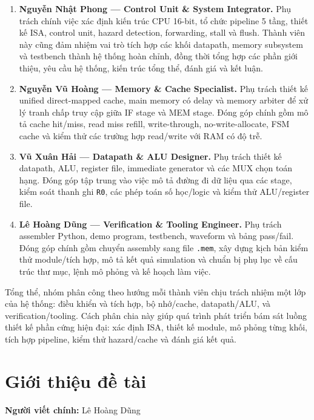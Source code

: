 \documentclass[11pt,a4paper]{article}
\theoremstyle{definition}
\theoremstyle{remark}
\begin{document}
	\begin{enumerate}
		\item \textbf{Nguyễn Nhật Phong --- Control Unit \& System Integrator.} Phụ trách chính việc xác định kiến trúc CPU 16-bit, tổ chức pipeline 5 tầng, thiết kế ISA, control unit, hazard detection, forwarding, stall và flush. Thành viên này cũng đảm nhiệm vai trò tích hợp các khối datapath, memory subsystem và testbench thành hệ thống hoàn chỉnh, đồng thời tổng hợp các phần giới thiệu, yêu cầu hệ thống, kiến trúc tổng thể, đánh giá và kết luận.
		\item \textbf{Nguyễn Vũ Hoàng --- Memory \& Cache Specialist.} Phụ trách thiết kế unified direct-mapped cache, main memory có delay và memory arbiter để xử lý tranh chấp truy cập giữa IF stage và MEM stage. Đóng góp chính gồm mô tả cache hit/miss, read miss refill, write-through, no-write-allocate, FSM cache và kiểm thử các trường hợp read/write với RAM có độ trễ.
		\item \textbf{Vũ Xuân Hải --- Datapath \& ALU Designer.} Phụ trách thiết kế datapath, ALU, register file, immediate generator và các MUX chọn toán hạng. Đóng góp tập trung vào việc mô tả đường đi dữ liệu qua các stage, kiểm soát thanh ghi \texttt{R0}, các phép toán số học/logic và kiểm thử ALU/register file.
		\item \textbf{Lê Hoàng Dũng --- Verification \& Tooling Engineer.} Phụ trách assembler Python, demo program, testbench, waveform và bảng pass/fail. Đóng góp chính gồm chuyển assembly sang file \texttt{.mem}, xây dựng kịch bản kiểm thử module/tích hợp, mô tả kết quả simulation và chuẩn bị phụ lục về cấu trúc thư mục, lệnh mô phỏng và kế hoạch làm việc.
	\end{enumerate}
	
	Tổng thể, nhóm phân công theo hướng mỗi thành viên chịu trách nhiệm một lớp của hệ thống: điều khiển và tích hợp, bộ nhớ/cache, datapath/ALU, và verification/tooling. Cách phân chia này giúp quá trình phát triển bám sát luồng thiết kế phần cứng hiện đại: xác định ISA, thiết kế module, mô phỏng từng khối, tích hợp pipeline, kiểm thử hazard/cache và đánh giá kết quả.
	
	\newpage
	\tableofcontents
	\newpage
	
	\section{Giới thiệu đề tài}
	\textbf{Người viết chính:} Lê Hoàng Dũng
	
\end{document}

